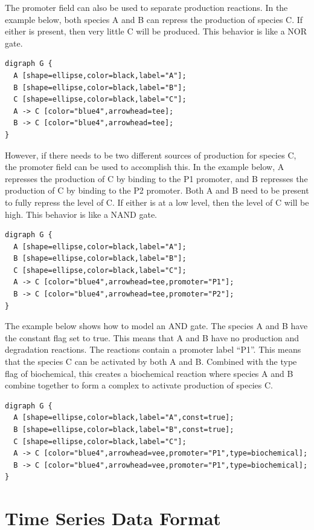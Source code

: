 \documentclass[titlepage,11pt]{article}
\begin{document}
The promoter field can also be used to separate production
reactions. In the example below, both species A and B can repress
the production of species C. If either is present, then very
little C will be produced. This behavior is like a NOR gate. 

\begin{verbatim}
digraph G {
  A [shape=ellipse,color=black,label="A"];
  B [shape=ellipse,color=black,label="B"];
  C [shape=ellipse,color=black,label="C"];
  A -> C [color="blue4",arrowhead=tee];
  B -> C [color="blue4",arrowhead=tee];
} 
\end{verbatim}

However, if there needs to be two different sources of
production for species C, the promoter field can be used to
accomplish this. In the example below, A represses the production
of C by binding to the P1 promoter, and B represses the
production of C by binding to the P2 promoter. Both A and B need
to be present to fully repress the level of C. If either is at a
low level, then the level of C will be high. This behavior is
like a NAND gate. 

\begin{verbatim}
digraph G {
  A [shape=ellipse,color=black,label="A"];
  B [shape=ellipse,color=black,label="B"];
  C [shape=ellipse,color=black,label="C"];
  A -> C [color="blue4",arrowhead=tee,promoter="P1"];
  B -> C [color="blue4",arrowhead=tee,promoter="P2"];
}
\end{verbatim}

The example below shows how to model an AND gate. The species
A and B have the constant flag set to true. This means that A and
B have no production and degradation reactions. The reactions
contain a promoter label ``P1''. This means that the
species C can be activated by both A and B. Combined with the
type flag of biochemical, this creates a biochemical reaction
where species A and B combine together to form a complex to
activate production of species C. 

\begin{verbatim}
digraph G {
  A [shape=ellipse,color=black,label="A",const=true];
  B [shape=ellipse,color=black,label="B",const=true];
  C [shape=ellipse,color=black,label="C"];
  A -> C [color="blue4",arrowhead=vee,promoter="P1",type=biochemical];
  B -> C [color="blue4",arrowhead=vee,promoter="P1",type=biochemical];
}
\end{verbatim}

\section{\label{TSD}Time Series Data Format}
\end{document}
